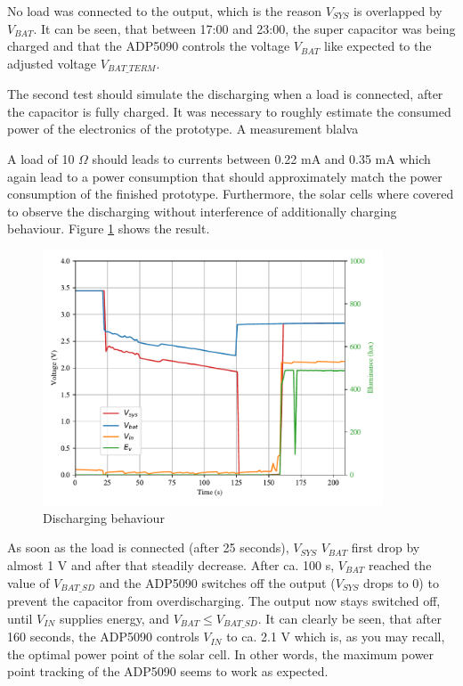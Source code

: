 No load was connected to the output, which is the reason $V_{SYS}$ is overlapped by $V_{BAT}$.
It can be seen, that between 17:00 and 23:00, the super capacitor was being charged and
that the ADP5090 controls the voltage $V_{BAT}$ like expected to the adjusted voltage $V_{BAT\_TERM}$.

The second test should simulate the discharging when a load is connected, after the capacitor is fully charged.
It was necessary to roughly estimate the consumed power of the electronics of the prototype.
A measurement blalva

A load of 10 $\Omega$ should leads to currents between 0.22 mA and 0.35 mA which again lead to a power consumption that should approximately match the power consumption of the finished prototype.
Furthermore, the solar cells where covered to observe the discharging without interference of additionally charging behaviour.
Figure \ref{development:discharge} shows the result.
 
\begin{figure}[h]
	\centering
	\includegraphics[width=0.9\textwidth]{5-development/hardware/graphics/entladen.pdf}
	\caption{Discharging behaviour\label{development:discharge}}
\end{figure}

As soon as the load is connected (after 25 seconds), $V_{SYS}$ $V_{BAT}$ first drop by almost 1 V and after that steadily decrease.
After ca. 100 s, $V_{BAT}$ reached the value of $V_{BAT\_SD}$ and the ADP5090 switches off the output ($V_{SYS}$ drops to 0) to prevent the capacitor from overdischarging.
The output now stays switched off, until $V_{IN}$ supplies energy, and $V_{BAT} \le V_{BAT\_SD}$.
It can clearly be seen, that after 160 seconds, the ADP5090 controls $V_{IN}$ to ca. 2.1 V which is, as you may recall, the optimal power point of the solar cell.
In other words, the maximum power point tracking of the ADP5090 seems to work as expected.
